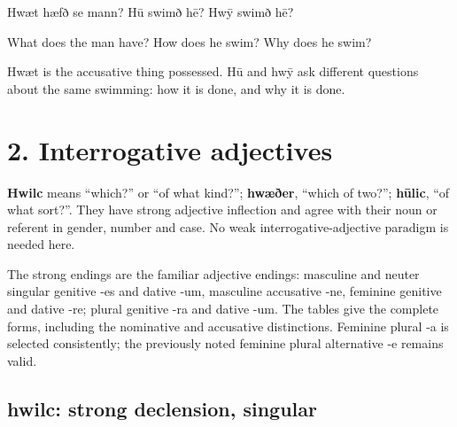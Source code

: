 Hwæt hæfð se mann? Hū swimð hē? Hwȳ swimð hē?

What does the man have? How does he swim? Why does he swim?

Hwæt is the accusative thing possessed. Hū and hwȳ ask different questions about the same swimming: how it is done, and why it is done.

\section*{2. Interrogative adjectives}

\textbf{Hwilc} means “which?” or “of what kind?”; \textbf{hwæðer}, “which of two?”; \textbf{hūlic}, “of what sort?”. They have strong adjective inflection and agree with their noun or referent in gender, number and case. No weak interrogative-adjective paradigm is needed here.

The strong endings are the familiar adjective endings: masculine and neuter singular genitive -es and dative -um, masculine accusative -ne, feminine genitive and dative -re; plural genitive -ra and dative -um. The tables give the complete forms, including the nominative and accusative distinctions. Feminine plural -a is selected consistently; the previously noted feminine plural alternative -e remains valid.

\subsection*{hwilc: strong declension, singular}

